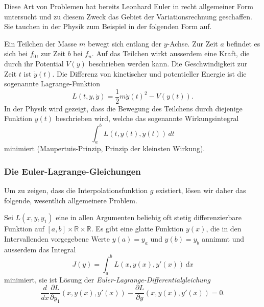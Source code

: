 Diese Art von Problemen hat bereits Leonhard Euler in recht allgemeiner
Form untersucht und zu diesem Zweck das Gebiet der Variationsrechnung
geschaffen.
%
%
%
Sie tauchen in der Physik zum Beispiel in der folgenden Form auf.
%

\begin{beispiel}
Ein Teilchen der Masse $m$ bewegt sich entlang der $y$-Achse.
%
%
Zur Zeit $a$ befindet es sich bei $f_0$, zur Zeit $b$ bei $f_n$.
Auf das Teilchen wirkt ausserdem eine Kraft, die durch ihr Potential $V(y)$
beschrieben werden kann.
%
%
Die Geschwindigkeit zur Zeit $t$ ist $\dot y(t)$.
%
Die Differenz von kinetischer und potentieller Energie ist
die sogenannte Lagrange-Funktion
%
%
%
\begin{equation}
L(t,y,\dot{y})
=
\frac12m\dot{y}(t)^2
-
V(y(t)).
\label{buch:equation:mechlagrange}
\end{equation}
In der Physik wird gezeigt, dass die Bewegung des Teilchens durch diejenige
Funktion $y(t)$ beschrieben wird, welche das sogenannte Wirkungsintegral
%
%
\[
\int_a^b L(t,y(t),\dot{y}(t))\,dt
\]
minimiert (Maupertuis-Prinzip, Prinzip der kleinsten Wirkung).
%
%
\end{beispiel}

\subsubsection{Die Euler-Lagrange-Gleichungen}
%
Um zu zeigen, dass die Interpolationsfunktion $g$ existiert, lösen
wir daher das folgende, wesentlich allgemeinere Problem.

\begin{satz}
\label{buch:satz:eulerlagrange}
Sei $L(x,y,y_1)$ eine in allen Argumenten beliebig oft stetig differenzierbare
Funktion auf $[a,b]\times \mathbb R \times \mathbb R$.
Es gibt eine glatte Funktion $y(x)$, die in den Intervallenden vorgegebene
Werte $y(a)=y_a$ und $y(b)=y_b$ annimmt und ausserdem das Integral
\[
J(y)
=
\int_a^b L(x, y(x), y'(x) ) \,dx
\]
minimiert,
sie ist Lösung der {\em Euler-Lagrange-Differentialgleichung}
%
\begin{equation}
\frac{d}{dx} \frac{\partial L}{\partial y_1} (x,y(x),y'(x))
-
\frac{\partial L}{\partial y} (x,y(x),y'(x))
=
0.
\label{buch:variation:eulerlagrange}
\end{equation}
\end{satz}

